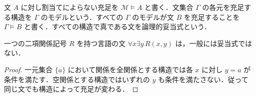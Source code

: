 \begin{defn}[モデルと意味論的帰結]
文 $A$ に対し割当てによらない充足を $\mathcal M\models A$ と書く．文集合 $\Gamma$ の各元を充足する構造を $\Gamma$ のモデルという．すべての $\Gamma$ のモデルが文 $B$ を充足することを $\Gamma\models B$ と書く．すべての構造で真である文を論理的妥当式という．
\end{defn}
\begin{prop}[構造によって変わる文の真理値]
一つの二項関係記号 $R$ を持つ言語の文 $\forall x\exists y\,R(x,y)$ は，一般には妥当式ではない．
\end{prop}
\begin{proof}
一元集合 $\{a\}$ において関係を全関係とする構造では各 $x$ に対し $y=a$ が条件を満たす．空関係とする構造ではいずれの $y$ も条件を満たさない．従って同じ文でも構造によって充足が変わる．
\end{proof}
